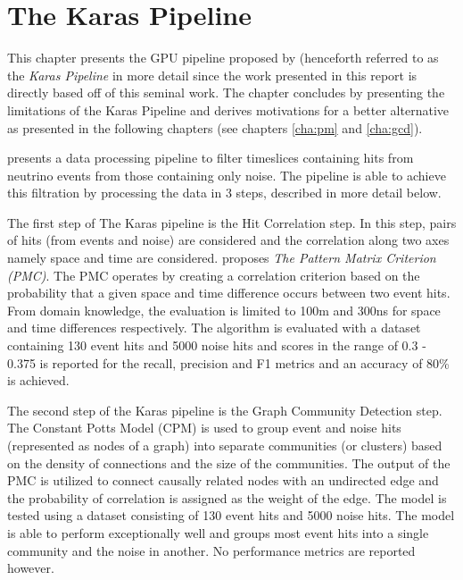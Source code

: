 \chapter{The Karas Pipeline}
\label{cha:karas-pipeline}

This chapter presents the GPU pipeline proposed by
\cite{karas2019data} (henceforth referred to as the \textit{Karas
  Pipeline} in more detail since the work presented in this report is
directly based off of this seminal work. The chapter concludes by
presenting the limitations of the Karas Pipeline and derives
motivations for a better alternative as presented in the following
chapters (see chapters \ref{cha:pm} and \ref{cha:gcd}).

\citeauthor{karas2019data} presents a data processing pipeline to filter
timeslices containing hits from neutrino events from those containing only
noise. The pipeline is able to achieve this filtration by processing the data
in 3 steps, described in more detail below.

The first step of The Karas pipeline is the Hit Correlation step. In this
step, pairs of hits (from events and noise) are considered and the correlation
along two axes namely space and time are
considered. \citeauthor{karas2019data} proposes \textit{The Pattern Matrix
Criterion (PMC)}. The PMC operates by creating a correlation criterion based
on the probability that a given space and time difference occurs between two
event hits. From domain knowledge, the evaluation is limited to 100m and 300ns
for space and time differences respectively. The algorithm is evaluated with
a dataset containing 130 event hits and 5000 noise hits and scores in the
range of 0.3 - 0.375 is reported for the recall, precision and F1 metrics
and an accuracy of 80\% is achieved.

The second step of the Karas pipeline is the Graph Community Detection
step. The Constant Potts Model (CPM) is used to group event and noise hits
(represented as nodes of a graph) into separate communities (or clusters)
based on the density of connections and the size of the communities. The
output of the PMC is utilized to connect causally related nodes with an
undirected edge and the probability of correlation is assigned as the weight
of the edge. The model is tested using a dataset consisting of 130 event hits
and 5000 noise hits. The model is able to perform exceptionally well and
groups most event hits into a single community and the noise in another. No
performance metrics are reported however.

